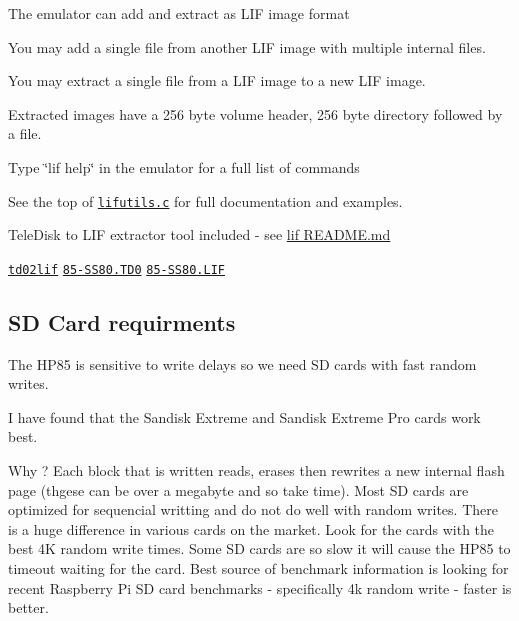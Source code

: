 \begin{DoxyItemize}
\begin{DoxyItemize}
\begin{DoxyItemize}
\item The emulator can add and extract as L\+IF image format
\begin{DoxyItemize}
\item You may add a single file from another L\+IF image with multiple internal files.
\item You may extract a single file from a L\+IF image to a new L\+IF image.
\item Extracted images have a 256 byte volume header, 256 byte directory followed by a file.
\end{DoxyItemize}
\item Type \char`\"{}lif help\char`\"{} in the emulator for a full list of commands
\begin{DoxyItemize}
\item See the top of \href{lif/lifutils.c}{\tt lifutils.\+c} for full documentation and examples.
\end{DoxyItemize}
\item Tele\+Disk to L\+IF extractor tool included -\/ see \hyperlink{md_lif_README}{lif R\+E\+A\+D\+ME.md}
\begin{DoxyItemize}
\item \href{lif/t202lif}{\tt td02lif} \href{lif/85-SS80.TD0}{\tt 85-\/\+S\+S80.\+T\+D0} \href{lif/85-SS80.LIF}{\tt 85-\/\+S\+S80.\+L\+IF} 


\end{DoxyItemize}
\end{DoxyItemize}
\end{DoxyItemize}
\end{DoxyItemize}

\subsection*{SD Card requirments}


\begin{DoxyItemize}
\item The H\+P85 is sensitive to write delays so we need SD cards with fast random writes.
\item I have found that the Sandisk Extreme and Sandisk Extreme Pro cards work best.
\item Why ? Each block that is written reads, erases then rewrites a new internal flash page (thgese can be over a megabyte and so take time). Most SD cards are optimized for sequencial writting and do not do well with random writes. There is a huge difference in various cards on the market. Look for the cards with the best 4K random write times. Some SD cards are so slow it will cause the H\+P85 to timeout waiting for the card. Best source of benchmark information is looking for recent Raspberry Pi SD card benchmarks -\/ specifically 4k random write -\/ faster is better.
\end{DoxyItemize}





